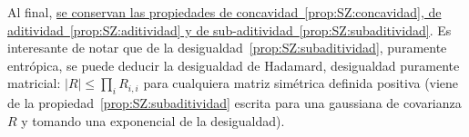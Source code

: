 Al      final,     \underline{se      conservan      las     propiedades      de
  concavidad~\ref{prop:SZ:concavidad},  de aditividad~\ref{prop:SZ:aditividad} y
  de sub-aditividad~\ref{prop:SZ:subaditividad}}.   Es interesante de  notar que
de la  desigualdad~\ref{prop:SZ:subaditividad}, puramente entr\'opica,  se puede
deducir la  desigualdad de Hadamard,  desigualdad puramente matricial:  $|R| \le
\prod_i R_{i,i}$ para cualquiera matriz sim\'etrica definida positiva (viene de la
propiedad~\ref{prop:SZ:subaditividad} escrita  para una gaussiana  de covarianza
$R$ y tomando una exponencial de la desigualdad).
